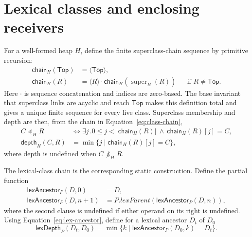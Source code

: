 \documentclass[11pt]{article}
\numberwithin{equation}{section}
\newcommand{\kw}[1]{\ensuremath{\mathsf{#1}}}
\newcommand{\Top}{\kw{Top}}
\newcommand{\super}{\mathop{\mathrm{super}}}
\begin{document}
\section{Lexical classes and enclosing receivers}

For a well-formed heap $H$, define the finite superclass-chain sequence by
primitive recursion:
\begin{equation}\label{eq:class-chain}
\begin{aligned}
 \mathsf{chain}_H(\Top) &= \langle\Top\rangle,\\
 \mathsf{chain}_H(R) &=
   \langle R\rangle\mathbin{\cdot}\mathsf{chain}_H(\super_H(R))
   &&\text{if }R\ne\Top.
\end{aligned}
\end{equation}
Here $\cdot$ is sequence concatenation and indices are zero-based.  The base
invariant that superclass links are acyclic and reach $\Top$ makes this
definition total and gives a unique finite sequence for every live class.
Superclass membership and depth are then, from the chain in
Equation~\eqref{eq:class-chain},
\begin{equation}\label{eq:class-membership-depth}
\begin{aligned}
 C\preceq_H R
 &\iff \exists j\,.
   0\le j<|\mathsf{chain}_H(R)|\ \land\
   \mathsf{chain}_H(R)[j]=C,\\
 \mathsf{depth}_H(C,R)
 &=\min\{j\mid \mathsf{chain}_H(R)[j]=C\},
\end{aligned}
\end{equation}
where depth is undefined when $C\not\preceq_H R$.

The lexical-class chain is the corresponding static construction.  Define the
partial function
\begin{equation}\label{eq:lex-ancestor}
\begin{aligned}
 \mathsf{lexAncestor}_P(D,0)&=D,\\
 \mathsf{lexAncestor}_P(D,n+1)&=
   P.\mathit{lexParent}(\mathsf{lexAncestor}_P(D,n)),
\end{aligned}
\end{equation}
where the second clause is undefined if either operand on its right is
undefined.  Using Equation~\eqref{eq:lex-ancestor}, define for a lexical
ancestor $D_t$ of $D_0$
\begin{equation}\label{eq:lex-depth}
 \mathsf{lexDepth}_P(D_t,D_0)=
   \min\{k\mid \mathsf{lexAncestor}_P(D_0,k)=D_t\}.
\end{equation}
\end{document}
